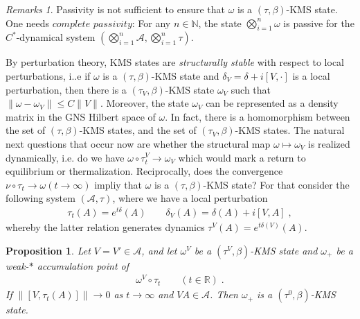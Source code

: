 \documentclass[
a4paper, %
11pt, %
onecolumn, %
openany, %
]{memoir}
\theoremstyle{definition}
\theoremstyle{remark}
\newtheorem{remarks}[definition]{Remarks}
\theoremstyle{plain}
\newtheorem{prop}[definition]{Proposition}
\begin{document}
\begin{remarks}
Passivity is not sufficient to ensure that $\omega$ is a $(\tau,\beta)$-KMS state. One needs $\textit{complete passivity}$: For any $n\in\mathbb{N}$, the state $\bigotimes
_{i=1}^n\omega$ is passive for the $C^*$-dynamical system $(\bigotimes_{i=1}^n \mathcal{A},\bigotimes_{i=1}^n\tau)$.
\end{remarks}
By perturbation theory, KMS states are \textit{structurally stable} with respect to local perturbations, i..e if $\omega$ is a $(\tau,\beta)$-KMS state and $\delta_V=\delta+i[V,\cdot]$ is a local perturbation, then there is a $(\tau_V,\beta)$-KMS state $\omega_V$ such that $\|\omega-\omega_V\|\leq C\|V\|$. Moreover, the state $\omega_V$ can be represented as a density matrix in the GNS Hilbert space of $\omega$. In fact, there is a homomorphism between the set of $(\tau,\beta)$-KMS states, and the set of $(\tau_V,\beta)$-KMS states. 
The natural next questions that occur now are whether the structural map $\omega\mapsto\omega_V$ is realized dynamically, i.e. do we have $\omega\circ\tau_t^V\rightarrow\omega_V$ which would mark a return to equilibrium or thermalization. Reciprocally, does the convergence $\nu\circ \tau_t\rightarrow\omega(t\rightarrow\infty)$ impliy that $\omega$ is a $(\tau,\beta)$-KMS state?
For that consider the following system $(\mathcal{A},\tau)$, where we have a local perturbation \begin{align}
\tau_t(A)=e^{t\delta}(A) \qquad \delta_V(A)=\delta(A)+i[V,A]\; ,
\end{align}
whereby the latter relation generates dynamics $\tau^V(A)=e^{t\delta(V)}(A)$.
\begin{prop}
Let $V=V'\in\mathcal{A}$, and let $\omega^V$ be a $(\tau^V,\beta)$-KMS state and $\omega_+$ be a weak-$*$ accumulation point of \begin{align}
\omega^V\circ \tau_t\qquad (t\in\mathbb{R})\; .
\end{align}
If $\| [V,\tau_t(A)]\| \rightarrow 0$ as $t\rightarrow \infty$ and $VA\in\mathcal{A}$. Then $\omega_+$ is a $(\tau^0,\beta)$-KMS state.
\end{prop}
\end{document}
